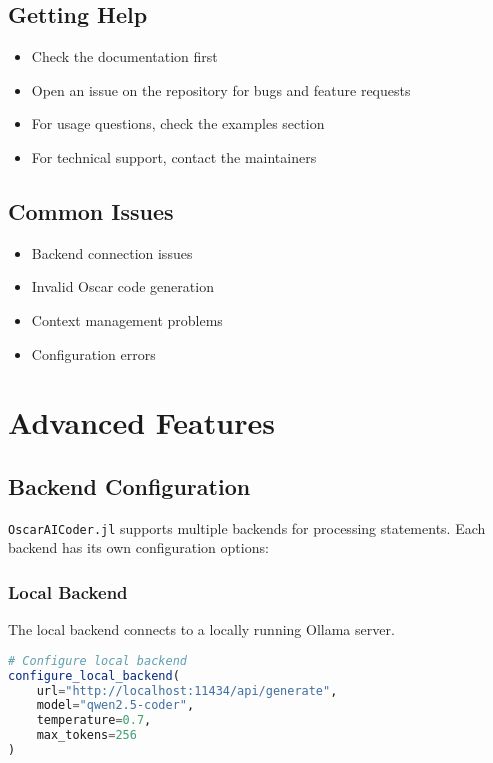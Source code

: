 \documentclass[11pt,a4paper]{article}
\newcommand{\modname}[1]{\texttt{#1}}
\begin{document}
\subsection{Getting Help}
\begin{itemize}
    \item Check the documentation first
    \item Open an issue on the repository for bugs and feature requests
    \item For usage questions, check the examples section
    \item For technical support, contact the maintainers
\end{itemize}

\subsection{Common Issues}
\begin{itemize}
    \item Backend connection issues
    \item Invalid Oscar code generation
    \item Context management problems
    \item Configuration errors
\end{itemize}

\section{Advanced Features}
\label{sec:advanced-features}

\subsection{Backend Configuration}
\label{subsec:backend_config}

\modname{OscarAICoder.jl} supports multiple backends for processing statements. Each backend has its own configuration options:

\subsubsection{Local Backend}
The local backend connects to a locally running Ollama server.

\begin{lstlisting}[language=Julia]
# Configure local backend
configure_local_backend(
    url="http://localhost:11434/api/generate",
    model="qwen2.5-coder",
    temperature=0.7,
    max_tokens=256
)
\end{lstlisting}
\end{document}
